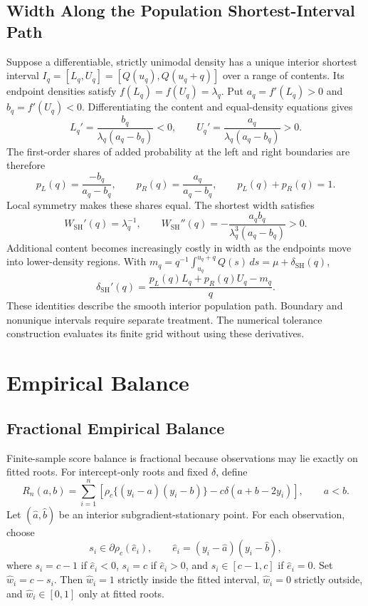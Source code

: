 \documentclass[11pt]{article}
\begin{document}
\subsection{Width Along the Population Shortest-Interval Path}

Suppose a differentiable, strictly unimodal density has a unique interior
shortest interval \(I_q=[L_q,U_q]=[Q(u_q),Q(u_q+q)]\) over a range of contents.
Its endpoint densities satisfy \(f(L_q)=f(U_q)=\lambda_q\).
Put \(a_q=f'(L_q)>0\) and \(b_q=f'(U_q)<0\). Differentiating the content
and equal-density equations gives
\[
L_q'=\frac{b_q}{\lambda_q(a_q-b_q)}<0,\qquad
U_q'=\frac{a_q}{\lambda_q(a_q-b_q)}>0.
\]
The first-order shares of added probability at the left and right boundaries
are therefore
\[
p_L(q)=\frac{-b_q}{a_q-b_q},\qquad
p_R(q)=\frac{a_q}{a_q-b_q},\qquad p_L(q)+p_R(q)=1.
\]
Local symmetry makes these shares equal. The shortest width satisfies
\[
W_{\mathrm{SH}}'(q)=\lambda_q^{-1},\qquad
W_{\mathrm{SH}}''(q)=-\frac{a_qb_q}{\lambda_q^3(a_q-b_q)}>0.
\]
Additional content becomes increasingly costly in width as the endpoints
move into lower-density regions. With
\(m_q=q^{-1}\int_{u_q}^{u_q+q}Q(s)\,ds=\mu+\delta_{\mathrm{SH}}(q)\),
\[
\delta_{\mathrm{SH}}'(q)=\frac{p_L(q)L_q+p_R(q)U_q-m_q}{q}.
\]
These identities describe the smooth interior population path. Boundary and
nonunique intervals require separate treatment. The numerical tolerance
construction evaluates its finite grid without using these derivatives.

\section{Empirical Balance}
\label{sec:supp-static-theory}

\subsection{Fractional Empirical Balance}

Finite-sample score balance is fractional because observations may lie exactly
on fitted roots. For intercept-only roots and fixed \(\delta\), define
\[
R_n(a,b)
=\sum_{i=1}^n
\left[
\rho_c\{(y_i-a)(y_i-b)\}
-c\delta(a+b-2y_i)
\right],
\qquad a<b.
\]
Let \((\widehat a,\widehat b)\) be an interior subgradient-stationary point.
For each observation, choose
\[
s_i\in\partial\rho_c(\widehat e_i),
\qquad
\widehat e_i=(y_i-\widehat a)(y_i-\widehat b),
\]
where \(s_i=c-1\) if \(\widehat e_i<0\), \(s_i=c\) if
\(\widehat e_i>0\), and \(s_i\in[c-1,c]\) if \(\widehat e_i=0\). Set
\(\widehat w_i=c-s_i\). Then
\(\widehat w_i=1\) strictly inside the fitted interval,
\(\widehat w_i=0\) strictly outside, and
\(\widehat w_i\in[0,1]\) only at fitted roots.
\end{document}

